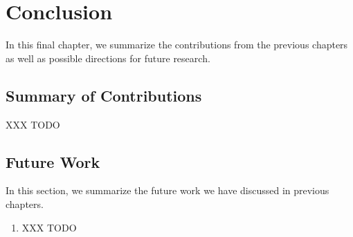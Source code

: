 \chapter{Conclusion}
\label{:conclusion}

In this final chapter, we summarize the contributions from the previous chapters as well as possible directions for future research.

\section{Summary of Contributions}
\label{:conclusion:contributions}

XXX TODO


\section{Future Work}
\label{:conclusion:open-problems}

In this section, we summarize the future work we have discussed in previous chapters.

\begin{enumerate}
\item XXX TODO

\end{enumerate}
